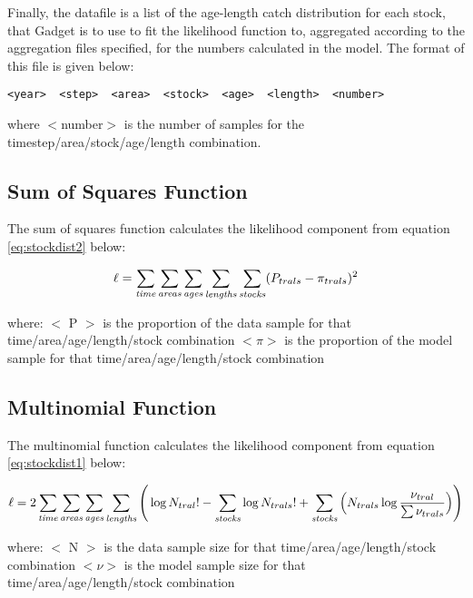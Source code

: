 \documentclass[]{book}
\begin{document}
Finally, the datafile is a list of the age-length catch distribution for
each stock, that Gadget is to use to fit the likelihood function to,
aggregated according to the aggregation files specified, for the numbers
calculated in the model. The format of this file is given below:

\begin{verbatim}
<year>  <step>  <area>  <stock>  <age>  <length>  <number>
\end{verbatim}

where \(<\)number\(>\) is the number of samples for the
timestep/area/stock/age/length combination.

\hypertarget{sum-of-squares-function-1}{%
\subsection{Sum of Squares Function}\label{sum-of-squares-function-1}}

The sum of squares function calculates the likelihood component from
equation \eqref{eq:stockdist2} below:

\begin{equation}
\label{eq:stockdist2}
\ell = \sum_{\it time}\sum_{\it areas}\sum_{\it ages}\sum_{\it lengths}\sum_{\it stocks} ( P_{trals} - \pi_{trals} ) ^2\end{equation}

where: \(<\) P \(>\) is the proportion of the data sample for that
time/area/age/length/stock combination \(<\pi>\) is the proportion of the
model sample for that time/area/age/length/stock combination

\hypertarget{multinomial-function-1}{%
\subsection{Multinomial Function}\label{multinomial-function-1}}

The multinomial function calculates the likelihood component from
equation \eqref{eq:stockdist1} below:

\begin{equation}
\label{eq:stockdist1}
\ell = 2 \sum_{\it time}\sum_{\it areas}\sum_{\it ages}\sum_{\it lengths} \Bigg( \log N_{tral}! - \sum_{\it stocks} \log N_{trals}! + \sum_{\it stocks} \Big( N_{trals} \log {\frac{\nu_{tral}}{\sum \nu_{trals}}} \Big)\Bigg)\end{equation}

where: \(<\) N \(>\) is the data sample size for that
time/area/age/length/stock combination \(<\nu>\) is the model sample size
for that time/area/age/length/stock combination
\end{document}
